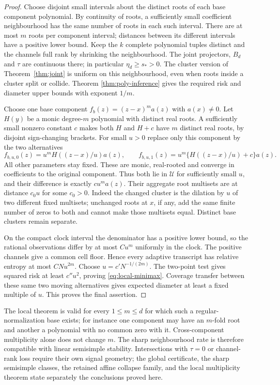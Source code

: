 \begin{proof}
Choose disjoint small intervals about the distinct roots of each base
component polynomial. By continuity of roots, a sufficiently small
coefficient neighbourhood has the same number of roots in each such
interval. There are at most $m$ roots per component interval; distances
between its different intervals have a positive lower bound. Keep the
$k$ complete polynomial tuples distinct and the channels full rank by
shrinking the neighbourhood. The joint projectors, $B_d$ and $\tau$
are continuous there; in particular $\eta_d\ge s_*>0$. The cluster
version of Theorem~\ref{thm:joint} is uniform on this neighbourhood,
even when roots inside a cluster split or collide. Theorem
\ref{thm:poly-inference} gives the required risk and diameter upper
bounds with exponent $1/m$.

Choose one base component $f_b(z)=(z-x)^m a(z)$ with $a(x)\ne0$.
Let $H(y)$ be a monic degree-$m$ polynomial with distinct real roots.
A sufficiently small nonzero constant $c$ makes both $H$ and $H+c$
have $m$ distinct real roots, by disjoint sign-changing brackets.
For small $u>0$ replace only this component by the two alternatives
\begin{equation}\label{eq:moving-alternatives}
 f_{b,u,0}(z)=u^mH((z-x)/u)a(z),\qquad
 f_{b,u,1}(z)=u^m\{H((z-x)/u)+c\}a(z).
\end{equation}
All other parameters stay fixed. These are monic, real-rooted and
converge in coefficients to the original component. Thus both lie in
$\mathcal U$ for sufficiently small $u$, and their difference is
exactly $cu^m a(z)$. Their aggregate root multisets are at distance
$c_0u$ for some $c_0>0$. Indeed the changed cluster is the dilation by
$u$ of two different fixed multisets; unchanged roots at $x$, if any,
add the same finite number of zeros to both and cannot make those
multisets equal. Distinct base clusters remain separate.

On the compact clock interval the denominator has a positive lower
bound, so the rational observations differ by at most $Cu^m$ uniformly
in the clock. The positive channels give a common cell floor. Hence
every adaptive transcript has relative entropy at most $CNu^{2m}$.
Choose $u=c'N^{-1/(2m)}$. The two-point test gives squared risk at
least $c''u^2$, proving \eqref{eq:local-minimax}. Coverage transfer
between these same two moving alternatives gives expected diameter
at least a fixed multiple of $u$. This proves the final assertion.
\end{proof}

The local theorem is valid for every $1\le m\le d$ for which such a
regular-normalization base exists; for instance one component may have
an $m$-fold root and another a polynomial with no common zero with it.
Cross-component multiplicity alone does not change $m$. The sharp
neighbourhood rate is therefore compatible with linear semisimple
stability. Intersections with $\tau=0$ or channel-rank loss require
their own signal geometry; the global certificate, the sharp
semisimple classes, the retained affine collapse family, and the local
multiplicity theorem state separately the conclusions proved here.
